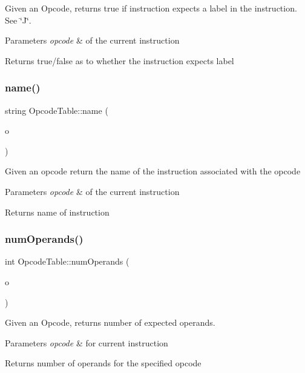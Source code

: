 Given an Opcode, returns true if instruction expects a label in the instruction. See \char`\"{}\+J\char`\"{}. 
\begin{DoxyParams}{Parameters}
{\em opcode} & of the current instruction \\
\hline
\end{DoxyParams}
\begin{DoxyReturn}{Returns}
true/false as to whether the instruction expects label 
\end{DoxyReturn}
\mbox{\label{class_opcode_table_a4021673f3dcfc1ef29fa4d7777838c96}} 
\subsubsection{\texorpdfstring{name()}{name()}}
{\footnotesize\ttfamily string Opcode\+Table\+::name (\begin{DoxyParamCaption}\item[{Opcode}]{o }\end{DoxyParamCaption})}

Given an opcode return the name of the instruction associated with the opcode 
\begin{DoxyParams}{Parameters}
{\em opcode} & of the current instruction \\
\hline
\end{DoxyParams}
\begin{DoxyReturn}{Returns}
name of instruction 
\end{DoxyReturn}
\mbox{\label{class_opcode_table_af92b88d033ed5f2ba8cdf732ec3a0265}} 
\subsubsection{\texorpdfstring{num\+Operands()}{numOperands()}}
{\footnotesize\ttfamily int Opcode\+Table\+::num\+Operands (\begin{DoxyParamCaption}\item[{Opcode}]{o }\end{DoxyParamCaption})}

Given an Opcode, returns number of expected operands. 
\begin{DoxyParams}{Parameters}
{\em opcode} & for current instruction \\
\hline
\end{DoxyParams}
\begin{DoxyReturn}{Returns}
number of operands for the specified opcode 
\end{DoxyReturn}
\mbox{\label{class_opcode_table_ada77e4c8328f3a2730fc0974899da28f}} 
